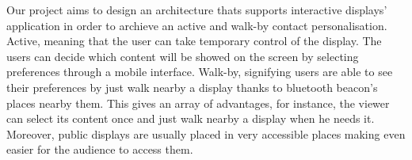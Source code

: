 \documentclass[]{usiinfbachelorproject}
\begin{document}
Our project aims to design an architecture thats supports interactive displays' application in order to archieve an active and walk-by contact personalisation. Active, meaning that the user can take temporary control of the display. The users can decide which content will be showed on the screen by selecting preferences through a mobile interface. 
Walk-by, signifying users are able to see their preferences by just walk nearby a display thanks to bluetooth beacon's places nearby them. This gives an array of advantages, for instance, the viewer can select its content once and just walk nearby a display when he needs it. Moreover, public displays are usually placed in very accessible places making even easier for the audience to access them. 
 
%
%


% 
%
 
\end{document}
